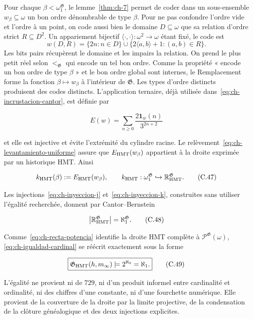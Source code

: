 Pour chaque \(\beta<\omega_1^{\mathfrak G}\), le lemme~\ref{thm:ch-7} permet de coder dans un
sous-ensemble \(w_\beta\subseteq\omega\) un bon ordre dénombrable de type
\(\beta\). Pour ne pas confondre l’ordre vide et l’ordre à un point, on code
aussi bien le domaine \(D\subseteq\omega\) que sa relation d’ordre strict
\(R\subseteq D^2\). Un appariement bijectif
\(\langle\cdot,\cdot\rangle:\omega^2\to\omega\) étant fixé, le code est
\[
 w(D,R)=\{2n:n\in D\}\cup
        \{2\langle a,b\rangle+1:(a,b)\in R\}.
\]
Les bits pairs récupèrent le domaine et les impairs la relation. On prend le
plus petit réel selon \(<_{\mathfrak G}\) qui encode un tel bon ordre. Comme la propriété
« encode un bon ordre de type \(\beta\) » et le bon ordre global sont internes,
le Remplacement forme la fonction \(\beta\mapsto w_\beta\) à l’intérieur de
\(\mathfrak G\). Les types d’ordre distincts produisent des codes distincts.
L’application ternaire, déjà utilisée dans~\eqref{eq:ch-incrustacion-cantor}, est définie par

\[
 E(w)=\sum_{n\ge0}\frac{2\mathbf1_w(n)}{3^{2n+2}}
\tag{C.46}\label{eq:ch-incrustacion-ternaria}
\]

et elle est injective et évite l'extrémité du cylindre racine. Le relèvement~\eqref{eq:ch-levantamiento-uniforme} assure que \(E_{\rm HMT}(w_\beta)\) appartient à la droite exprimée par un historique HMT. Ainsi

\[
 k_{\rm HMT}(\beta):=E_{\rm HMT}(w_\beta),
 \qquad
 k_{\rm HMT}:\omega_1^{\mathfrak G}
 \hookrightarrow\mathbb R_{\rm HMT}^{\mathfrak G}.
\tag{C.47}\label{eq:ch-inyeccion-k}
\]

Les injections~\eqref{eq:ch-inyeccion-j} et~\eqref{eq:ch-inyeccion-k}, construites sans utiliser l’égalité recherchée,
donnent par Cantor--Bernstein

\[
 \bigl|\mathbb R_{\rm HMT}^{\mathfrak G}\bigr|
 =\aleph_1^{\mathfrak G}.
\tag{C.48}\label{eq:ch-igualdad-cardinal}
\]

Comme~\eqref{eq:ch-recta-potencia} identifie la droite HMT complète à
\(\mathcal P^{\mathfrak G}(\omega)\), \eqref{eq:ch-igualdad-cardinal} se réécrit exactement sous la forme

\[
 \boxed{
  \mathfrak G_{\rm HMT}(h,m_\infty)
  \models 2^{\aleph_0}=\aleph_1.}
\tag{C.49}\label{eq:ch-decision}
\]

L'égalité ne provient ni de \(729\), ni d'un produit informel entre cardinalité et ordinalité, ni des chiffres d'une constante, ni d'une fourchette numérique. Elle provient de la couverture de la droite par la limite projective, de la condensation de la clôture généalogique et des deux injections explicites.

